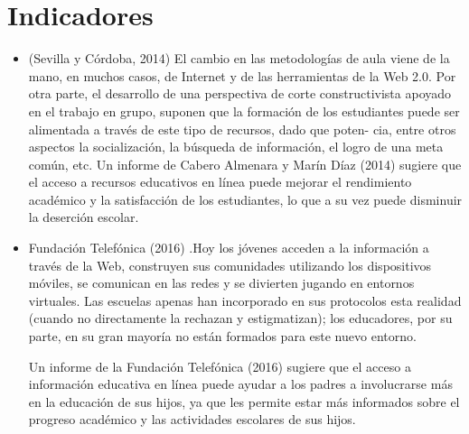 \section{Indicadores}
\begin{itemize}
	\item(Sevilla y Córdoba, 2014) El cambio en las metodologías de aula viene de la mano, en muchos casos, de Internet y de las herramientas de la Web 2.0. Por otra parte, el desarrollo de una perspectiva de corte constructivista apoyado en el trabajo en grupo, suponen que la formación de los estudiantes puede ser alimentada a través de este tipo de recursos, dado que poten- cia, entre otros aspectos la socialización, la búsqueda de información, el logro de una meta común, etc.
	Un informe de Cabero Almenara y Marín Díaz (2014) sugiere que el acceso a recursos educativos en línea puede mejorar el rendimiento académico y la satisfacción de los estudiantes, lo que a su vez puede disminuir la deserción escolar.
	\item Fundación Telefónica (2016) .Hoy los jóvenes acceden a la información a través de la Web, construyen sus comunidades utilizando los dispositivos móviles, se comunican en las redes y se divierten jugando en entornos virtuales. Las escuelas apenas han incorporado en sus protocolos esta realidad (cuando no directamente la rechazan y estigmatizan); los educadores, por su parte, en su gran mayoría no están formados para este nuevo entorno. 
	
	Un informe de la Fundación Telefónica (2016) sugiere que el acceso a información educativa en línea puede ayudar a los padres a involucrarse más en la educación de sus hijos, ya que les permite estar más informados sobre el progreso académico y las actividades escolares de sus hijos.
	
\end{itemize}